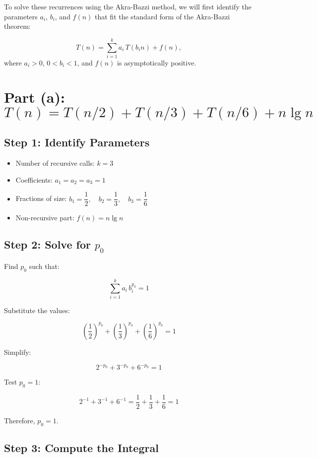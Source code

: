 \documentclass[10pt,letter,notitlepage]{article}
\begin{document}
\begin{Answer}
To solve these recurrences using the Akra-Bazzi method, we will first identify the parameters \( a_i \), \( b_i \), and \( f(n) \) that fit the standard form of the Akra-Bazzi theorem:

\[
T(n) = \sum_{i=1}^{k} a_i\, T(b_i n) + f(n),
\]
where \( a_i > 0 \), \( 0 < b_i < 1 \), and \( f(n) \) is asymptotically positive.

\section*{Part (a): \( T(n) = T(n/2) + T(n/3) + T(n/6) + n \lg n \)}

\subsection*{Step 1: Identify Parameters}

\begin{itemize}
    \item Number of recursive calls: \( k = 3 \)
    \item Coefficients: \( a_1 = a_2 = a_3 = 1 \)
    \item Fractions of size: \( b_1 = \dfrac{1}{2},\quad b_2 = \dfrac{1}{3},\quad b_3 = \dfrac{1}{6} \)
    \item Non-recursive part: \( f(n) = n \lg n \)
\end{itemize}

\subsection*{Step 2: Solve for \( p_0 \)}

Find \( p_0 \) such that:

\[
\sum_{i=1}^{k} a_i\, b_i^{p_0} = 1
\]

Substitute the values:

\[
\left( \dfrac{1}{2} \right)^{p_0} + \left( \dfrac{1}{3} \right)^{p_0} + \left( \dfrac{1}{6} \right)^{p_0} = 1
\]

Simplify:

\[
2^{-p_0} + 3^{-p_0} + 6^{-p_0} = 1
\]

Test \( p_0 = 1 \):

\[
2^{-1} + 3^{-1} + 6^{-1} = \dfrac{1}{2} + \dfrac{1}{3} + \dfrac{1}{6} = 1
\]

Therefore, \( p_0 = 1 \).

\subsection*{Step 3: Compute the Integral}


\end{Answer}
\end{document}
